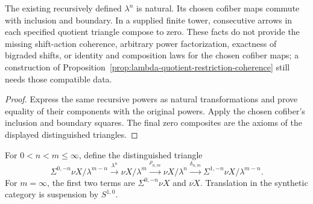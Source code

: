\begin{proposition}
  \label{prop:finite-lambda-quotient-local-laws}
  \leanok
  The existing recursively defined $\lambda^n$ is natural. Its chosen
  cofiber maps commute with inclusion and boundary. In a supplied finite
  tower, consecutive arrows in each specified quotient triangle compose
  to zero. These facts do not provide the missing shift-action coherence,
  arbitrary power factorization, exactness of bigraded shifts, or identity
  and composition laws for the chosen cofiber maps; a construction of
  Proposition~\ref{prop:lambda-quotient-restriction-coherence} still needs
  those compatible data.
\end{proposition}
\begin{proof}
  Express the same recursive powers as natural transformations and prove
  equality of their components with the original powers. Apply the chosen
  cofiber's inclusion and boundary squares. The final zero composites are
  the axioms of the displayed distinguished triangles.
  \leanok
\end{proof}

\begin{definition}
  \label{def:lambda-rho-delta-triangle}
  \notready
  For $0<n<m\le\infty$, define the distinguished triangle
  \[
    \Sigma^{0,-n}\nu X/\lambda^{m-n}
      \xrightarrow{\lambda^n}\nu X/\lambda^m
      \xrightarrow{\rho_{n,m}}\nu X/\lambda^n
      \xrightarrow{\delta_{n,m}}
      \Sigma^{1,-n}\nu X/\lambda^{m-n}.
  \]
  For $m=\infty$, the first two terms are
  $\Sigma^{0,-n}\nu X$ and $\nu X$.  Translation in the synthetic category is
  suspension by $S^{1,0}$.
\end{definition}
